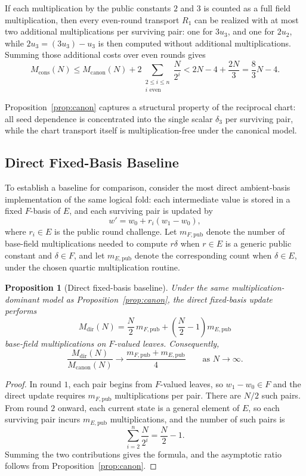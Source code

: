 \documentclass[11pt]{article}
\newtheorem{proposition}[theorem]{Proposition}
\begin{document}
If each multiplication by the public constants \(2\) and \(3\) is counted as a full field multiplication, then every even-round transport \(R_1\) can be realized with at most two additional multiplications per surviving pair: one for \(3u_3\), and one for \(2u_2\), while \(2u_3=(3u_3)-u_3\) is then computed without additional multiplications. Summing those additional costs over even rounds gives
\[
M_{\mathrm{cons}}(N)
\le
M_{\mathrm{canon}}(N)+2\sum_{\substack{2\le i\le n\\ i\text{ even}}}\frac{N}{2^i}
< 2N-4+\frac{2N}{3}
=\frac{8}{3}N-4.
\]

Proposition~\ref{prop:canon} captures a structural property of the reciprocal chart: all seed dependence is concentrated into the single scalar \(\delta_3\) per surviving pair, while the chart transport itself is multiplication-free under the canonical model.

\subsection*{Direct Fixed-Basis Baseline}

To establish a baseline for comparison, consider the most direct ambient-basis implementation of the same logical fold: each intermediate value is stored in a fixed \(F\)-basis of \(E\), and each surviving pair is updated by
\[
w' = w_0 + r_i(w_1-w_0),
\]
where \(r_i\in E\) is the public round challenge. Let \(m_{F,\mathrm{pub}}\) denote the number of base-field multiplications needed to compute \(r\delta\) when \(r\in E\) is a generic public constant and \(\delta\in F\), and let \(m_{E,\mathrm{pub}}\) denote the corresponding count when \(\delta\in E\), under the chosen quartic multiplication routine.

\begin{proposition}[Direct fixed-basis baseline]
\label{prop:baseline}
Under the same multiplication-dominant model as Proposition~\ref{prop:canon}, the direct fixed-basis update performs
\[
M_{\mathrm{dir}}(N)
=
\frac{N}{2}\,m_{F,\mathrm{pub}}
+
\left(\frac{N}{2}-1\right)m_{E,\mathrm{pub}}
\]
base-field multiplications on \(F\)-valued leaves. Consequently,
\[
\frac{M_{\mathrm{dir}}(N)}{M_{\mathrm{canon}}(N)}
\longrightarrow
\frac{m_{F,\mathrm{pub}}+m_{E,\mathrm{pub}}}{4}
\qquad\text{as }N\to\infty.
\]
\end{proposition}

\begin{proof}
In round \(1\), each pair begins from \(F\)-valued leaves, so \(w_1-w_0\in F\) and the direct update requires \(m_{F,\mathrm{pub}}\) multiplications per pair. There are \(N/2\) such pairs. From round \(2\) onward, each current state is a general element of \(E\), so each surviving pair incurs \(m_{E,\mathrm{pub}}\) multiplications, and the number of such pairs is
\[
\sum_{i=2}^{n}\frac{N}{2^i}=\frac{N}{2}-1.
\]
Summing the two contributions gives the formula, and the asymptotic ratio follows from Proposition~\ref{prop:canon}.
\end{proof}
\end{document}
